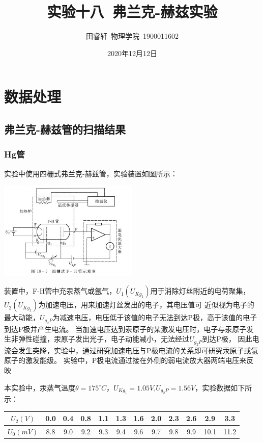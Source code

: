 \documentclass{article}
\title{\heiti 实验十八\ 弗兰克-赫兹实验}
\author{\kaishu 田睿轩\ 物理学院\ 1900011602}
\date{2020年12月12日}
\newcommand{\degreesCelsius}{^\circ C}
\begin{document}
    \maketitle
    \section{数据处理}
    \subsection{弗兰克-赫兹管的扫描结果}
    \subsubsection{Hg管}
    实验中使用四栅式弗兰克-赫兹管，实验装置如图所示：\par
    \begin{center}
        \includegraphics[width=0.5\textwidth]{experiment utility.jpg}
    \end{center}

    装置中，F-H管中充汞蒸气或氩气，$U_1(U_{Kg_1})$用于消除灯丝附近的电荷聚集，$U_2(U_{Kg_2})$为加速电压，用来加速灯丝发出的电子，其电压值可
    近似视为电子的最大动能，$U_{g_2P}$为减速电压，电压低于该值的电子无法到达P极，高于该值的电子到达P极并产生电流。
    当加速电压达到汞原子的某激发电压时，电子与汞原子发生非弹性碰撞，汞原子发出光子，电子动能减小，无法经过$U_{g_2P}$到达P极，
    因此电流会发生突降，实验中，通过研究加速电压与P极电流的关系即可研究汞原子或氩原子的激发能级。
    实验中，P极电流通过接在外侧的弱电流放大器两端电压来反映

    本实验中，汞蒸气温度$\theta=175\degreesCelsius$，$U_{Kg_1}=1.05V$,$U_{g_2P}=1.56V$，实验数据如下所示：

    \begin{center}
        \begin{tabular}{|c|c|c|c|c|c|c|c|c|c|c|c|}
            \hline
            $U_2(V)$ & 0.0   & 0.4   & 0.8   & 1.1   & 1.3   & 1.6   & 2.0   & 2.3   & 2.6   & 2.9   & 3.3  \\
            \hline
            $U_0(mV)$ & 8.8   & 9.0   & 9.2   & 9.3   & 9.4   & 9.6   & 9.7   & 9.8   & 9.9   & 10.1  & 11.2  \\
            \hline
        \end{tabular}%
    \end{center}
\end{document}
